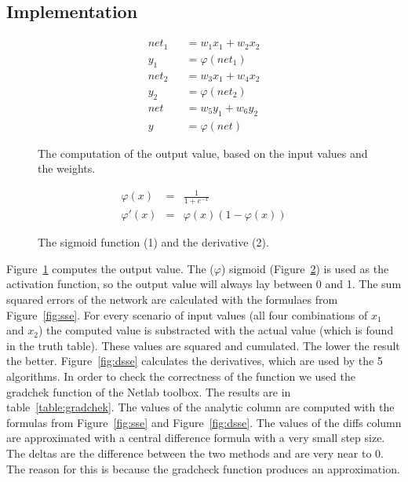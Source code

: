 \documentclass{article}
\begin{document}
\subsection{Implementation}
\begin{figure}[H]
	\centering
	\begin{eqnarray}
		net_1 &&= w_1x_1 + w_2x_2 \\
		y_1 &&= \varphi(net_1) \\
		net_2 &&= w_3x_1 + w_4x_2 \\
		y_2 &&= \varphi(net_2) \\
		net &&= w_5y_1 + w_6y_2\\
		y &&= \varphi(net)
	\end{eqnarray}
	\caption{The computation of the output value, based on the input values and the weights.}
	\label{fig:net}
\end{figure}

\begin{figure}[H]
	\centering
	\begin{eqnarray}
	 \varphi(x) & = & \frac{1}{1 + e^{-x}} \\
	   \varphi'(x) & = & \varphi(x)(1 - \varphi(x))
	\end{eqnarray}
	\caption{The sigmoid function (1) and the derivative (2).}
	\label{fig:sig}
\end{figure}

Figure~\ref{fig:net} computes the output value. The ($\varphi$) sigmoid (Figure~\ref{fig:sig}) is used as the activation function, so the output value will always lay between 0 and 1. The sum squared errors of the network are calculated with the formulaes from Figure~\ref{fig:sse}. For every scenario of input values (all four combinations of $x_1$ and $x_2$) the computed value is substracted with the actual value (which is found in the truth table). These values are squared and cumulated. The lower the result the better. Figure~\ref{fig:dsse} calculates the derivatives, which are used by the 5 algorithms. In order to check the correctness of the function we used the gradchek function of the Netlab toolbox. The results are in table~\ref{table:gradchek}. The values of the analytic column are computed with the formulas from Figure~\ref{fig:sse} and Figure~\ref{fig:dsse}. The values of the diffs column are approximated with a central difference formula with a very small step size. The deltas are the difference between the two methods and are very near to 0. The reason for this is because the gradcheck function produces an approximation. 
\end{document}
